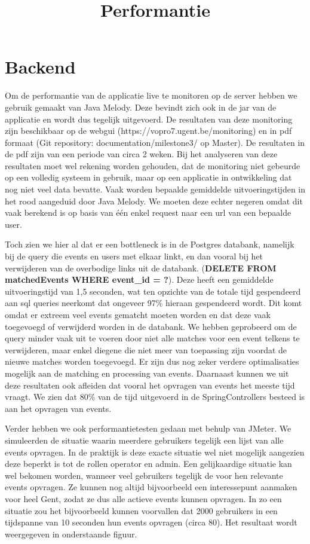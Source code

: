 \documentclass[11pt,twoside,a4paper]{article}
\title{Performantie}
\begin{document}


\section*{Backend}
 
 Om de performantie van de applicatie live te monitoren op de server hebben we gebruik gemaakt van Java Melody. Deze bevindt zich ook in de jar van de applicatie en wordt dus tegelijk uitgevoerd. De resultaten van deze monitoring zijn beschikbaar op de webgui (https://vopro7.ugent.be/monitoring) en in pdf formaat (Git repository: documentation/milestone3/ op Master). De resultaten in de pdf zijn van een periode van circa 2 weken. Bij het analyseren van deze resultaten moet wel rekening worden gehouden, dat de monitoring niet gebeurde op een volledig systeem in gebruik, maar op een applicatie in ontwikkeling dat nog niet veel data bevatte. Vaak worden bepaalde gemiddelde uitvoeringstijden in het rood aangeduid door Java Melody. We moeten deze echter negeren omdat dit vaak berekend is op basis van één enkel request naar een url van een bepaalde user.
 \par Toch zien we hier al dat er een bottleneck is in de Postgres databank, namelijk bij de query die events en users met elkaar linkt, en dan vooral bij het verwijderen van de overbodige links uit de databank. (\textbf{DELETE FROM matchedEvents WHERE event\_id = ?}). Deze heeft een gemiddelde uitvoeringstijd van 1,5 seconden, wat ten opzichte van de totale tijd gespendeerd aan sql queries neerkomt dat ongeveer 97\% hieraan gespendeerd wordt. Dit komt omdat er extreem veel events gematcht moeten worden en dat deze vaak toegevoegd of verwijderd worden in de databank. We hebben geprobeerd om de query minder vaak uit te voeren door niet alle matches voor een event telkens te verwijderen, maar enkel diegene die niet meer van toepassing zijn voordat de nieuwe matches worden toegevoegd. Er zijn dus nog zeker verdere optimalisaties mogelijk aan de matching en processing van events.
 Daarnaast kunnen we uit deze resultaten ook afleiden dat vooral het opvragen van events het meeste tijd vraagt. We zien dat 80\% van de tijd uitgevoerd in de SpringControllers besteed is aan het opvragen van events.
 
 
 Verder hebben we ook performantietesten gedaan met behulp van JMeter. We simuleerden de situatie waarin meerdere gebruikers tegelijk een lijst van alle events opvragen. In de praktijk is deze exacte situatie wel niet mogelijk aangezien deze beperkt is tot de rollen operator en admin. Een gelijkaardige situatie kan wel bekomen worden, wanneer veel gebruikers tegelijk de voor hen relevante events opvragen. Ze kunnen nog altijd bijvoorbeeld een interessepunt aanmaken voor heel Gent, zodat ze dus alle actieve events kunnen opvragen. In zo een situatie zou het bijvoorbeeld kunnen voorvallen dat 2000 gebruikers in een tijdspanne van 10 seconden hun events opvragen (circa 80). Het resultaat wordt weergegeven in onderstaande figuur.
 
\end{document}

